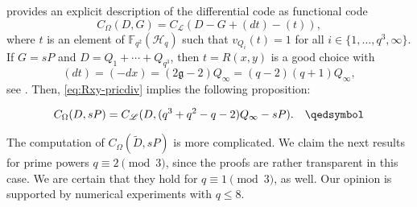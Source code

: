\documentclass[entropy,article,submit,pdftex,moreauthors]{Definitions/mdpi}
\newcommand{\g}{\mathfrak{g}}
\begin{document}
\cite[Proposition 8.1.2]{stichtenoth2009algebraic} provides an explicit description of the differential code as functional code
\[C_\Omega(D,G) = C_\mathscr{L}(D-G+(dt)-(t)),\]
where $t$ is an element of $\mathbb{F}_{q^2}(\mathscr{H}_q)$ such that $v_{Q_i}(t)=1$ for all $i\in \{1,\ldots,q^3,\infty\}$. If $G=sP$ and $D=Q_1+\cdots+Q_{q^3}$, then $t=R(x,y)$ is a good choice with 
\[(dt)=(-dx)=(2\g-2)Q_{\infty}=(q-2)(q+1)Q_{\infty}, \]
see \cite[Lemma 6.4.4]{stichtenoth2009algebraic}. Then, \eqref{eq:Rxy-pricdiv} implies the following proposition:
\begin{Proposition}
\[C_\Omega(D,sP) = C_\mathscr{L}(D,(q^3+q^2-q-2)Q_{\infty}-sP). \qed\]
\end{Proposition}

The computation of $C_\Omega(\widetilde{D},sP)$ is more complicated. We claim the next results for prime powers $q\equiv 2 \pmod3$, since the proofs are rather transparent in this case. We are certain that they hold for $q\equiv 1\pmod3$, as well. Our opinion is supported by numerical experiments with $q\leq 8$. 
\end{document}
